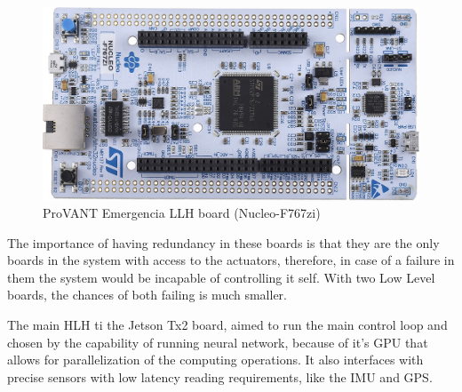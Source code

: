 \begin{figure}[htb]
	\caption{\label{fig:nucleo}ProVANT Emergencia \gls{LLH} board (Nucleo-F767zi)}
	\begin{center}
	    \includegraphics[width=.7\linewidth]{images/nucleo-f767zi.jpg}
	\end{center}
\end{figure}

The importance of having redundancy in these boards is that they are the only boards in the system with access to the actuators, therefore, in case of a failure in them the system would be incapable of controlling it self.
With two Low Level boards, the chances of both failing is much smaller.

The main \gls{HLH} ti the Jetson Tx2 board, aimed to run the main control loop and chosen by the capability of running neural network, because of it's \gls{GPU} that allows for parallelization of the computing operations. It also interfaces with precise sensors with low latency reading requirements, like the IMU and GPS. \cite{lara_design_2019,merchan_design_2021}

